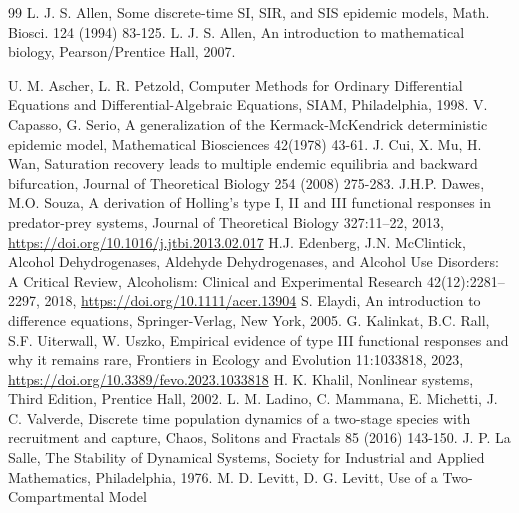 \documentclass[12pt]{article}
\theoremstyle{definition}
\theoremstyle{remark}
\numberwithin{equation}{section}
\begin{document}


\begin{thebibliography}{99}
L. J. S. Allen, Some discrete-time SI, SIR, and SIS epidemic models,
Math. Biosci. 124 (1994) 83-125.
L. J. S. Allen, An introduction to mathematical biology, Pearson/Prentice Hall, 2007.

U. M. Ascher, L. R. Petzold, Computer Methods for Ordinary Differential Equations and
Differential-Algebraic Equations, SIAM, Philadelphia, 1998.
V. Capasso, G. Serio, A generalization of the Kermack-McKendrick deterministic epidemic model, Mathematical Biosciences 42(1978) 43-61.
J. Cui, X. Mu, H. Wan, Saturation recovery leads to multiple endemic equilibria and
backward bifurcation, Journal of Theoretical Biology 254 (2008) 275-283.
J.H.P. Dawes, M.O. Souza, A derivation of Holling's type I, II and III functional responses in predator-prey systems, Journal of Theoretical Biology 327:11--22, 2013, \url{https://doi.org/10.1016/j.jtbi.2013.02.017}
H.J. Edenberg, J.N. McClintick, Alcohol Dehydrogenases, Aldehyde Dehydrogenases, and Alcohol Use Disorders: A Critical Review, Alcoholism: Clinical and Experimental Research 42(12):2281--2297, 2018, \url{https://doi.org/10.1111/acer.13904}
S. Elaydi, An introduction to difference equations, Springer-Verlag, New
York, 2005.
G. Kalinkat, B.C. Rall, S.F. Uiterwall, W. Uszko, Empirical evidence of type III functional responses and why it remains rare, Frontiers in Ecology and Evolution 11:1033818, 2023, \url{https://doi.org/10.3389/fevo.2023.1033818}
H. K. Khalil,
Nonlinear systems, 
Third Edition, Prentice Hall, 2002.
L. M. Ladino, C. Mammana, E. Michetti, J. C. Valverde, Discrete time
population dynamics of a two-stage species with recruitment and capture, Chaos, Solitons and Fractals 85 (2016) 143-150.
J. P. La Salle, The Stability of Dynamical Systems, Society for Industrial and Applied Mathematics, Philadelphia, 1976.
M. D. Levitt, D. G. Levitt, Use of a Two-Compartmental Model

\end{thebibliography}
\end{document}
